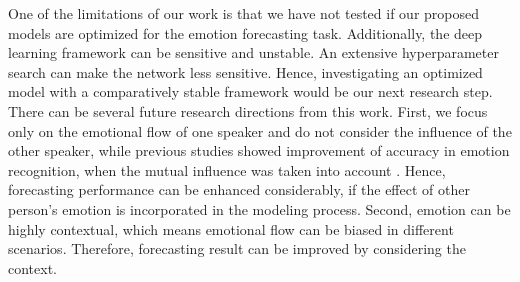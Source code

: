 One of the limitations of our work is that we have not tested if our proposed models are optimized for the emotion forecasting task.  Additionally, the deep learning framework can be sensitive and unstable. An extensive hyperparameter search can make the network less sensitive. Hence, investigating an optimized model with a comparatively stable framework would be our next research step. There can be several future research directions from this work. First, we focus only on the emotional flow of one speaker and do not consider the influence of the other speaker, while previous studies showed improvement of accuracy in emotion recognition, when the mutual influence was taken into account \cite{Mutual}. Hence, forecasting performance can be enhanced considerably, if the effect of other person's emotion is incorporated in the modeling process. Second, emotion can be highly contextual, which means emotional flow can be biased in different scenarios. Therefore, forecasting result can be improved by considering the context.


\renewcommand{\bibname}{References}


       
   


